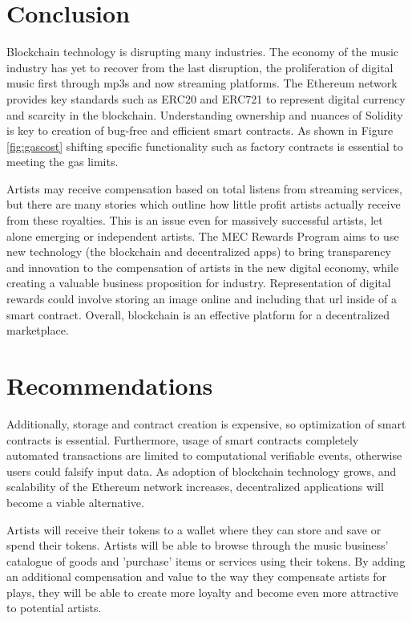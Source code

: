 \documentclass[12pt,tightenlines,letterpaper]{scrartcl}
\begin{document}

\newpage 
%
\section{Conclusion}
	

	
   Blockchain technology is disrupting many industries. The economy of the music industry has yet to recover from the last disruption, the proliferation of digital music first through mp3s and now streaming platforms. The Ethereum network provides key standards such as ERC20 and ERC721 to represent digital currency and scarcity in the blockchain. Understanding ownership and nuances of Solidity is key to creation of bug-free and efficient smart contracts. As shown in Figure \ref{fig:gascost} shifting specific functionality such as factory contracts is essential to meeting the gas limits.
   
   
   Artists may receive compensation based on total listens from streaming services, but there are many stories which outline how little profit artists actually receive from these royalties. This is an issue even for massively successful artists, let alone emerging or independent artists. The MEC Rewards Program aims to use new technology (the blockchain and decentralized apps) to bring transparency and innovation to the compensation of artists in the new digital economy, while creating a valuable business proposition for industry. Representation of digital rewards could involve storing an image online and including that url inside of a smart contract. Overall, blockchain is an effective platform for a decentralized marketplace.
\newpage
%
\section{Recommendations}
	
	Additionally, storage and contract creation is expensive, so optimization of smart contracts is essential. Furthermore, usage of \glspl{smart contract} completely automated transactions are limited to computational verifiable events, otherwise users could falsify input data. As adoption of blockchain technology grows, and scalability of the Ethereum network increases, decentralized applications will become a viable alternative.
	
	
	Artists will receive their tokens to a wallet where they can store and save or spend their tokens. Artists will be able to browse through the music business’ catalogue of goods and 'purchase' items or services using their tokens. By adding an additional compensation and value to the way they compensate artists for plays, they will be able to create more loyalty and become even more attractive to potential artists.
	
\end{document}
